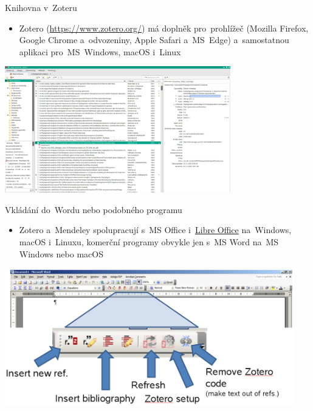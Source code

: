 \documentclass[compress, xelatex, 11pt, xcolor=svgnames, aspectratio=169,
	hyperref={
		bookmarks=true,
		unicode=true,
		colorlinks=true,
		pdftitle={Citacni software},
		plainpages=false,
		pdfauthor={Vojtech Zeisek},
		pdfsubject={Kratky uvod do citacniho software},
		pdfcreator={XeLaTeX},
		pdfkeywords={citace, reference, software, literatura},
		linkcolor=Crimson, %
		anchorcolor=Magenta, %
		citecolor=Magenta, %
		filecolor=Magenta, %
		menucolor=Magenta, %
		urlcolor=DarkTurquoise, %
		},
	url={hyphens, lowtilde} %
	]{beamer}
\begin{document}
\begin{frame}{Knihovna v~Zoteru}
	\begin{itemize}
		\item Zotero (\url{https://www.zotero.org/}) má doplněk pro~prohlížeč (Mozilla Firefox, Google Chrome a~odvozeniny, Apple Safari a~MS~Edge) a~samostatnou aplikaci pro~MS~Windows, macOS i~Linux
	\end{itemize}
	\begin{center}
		\includegraphics[height=5.5cm]{zotero.png}
	\end{center}
\end{frame}

\begin{frame}{Vkládání do~Wordu nebo podobného programu}
	\begin{itemize}
		\item Zotero a~Mendeley spolupracují s~MS Office i~\href{https://cs.libreoffice.org/}{Libre Office} na~Windows, macOS i~Linuxu, komerční programy obvykle jen s~MS Word na~MS Windows nebo macOS
	\end{itemize}
	\begin{center}
		\includegraphics[height=6cm]{zotero_lista.png}
	\end{center}
\end{frame}
\end{document}
